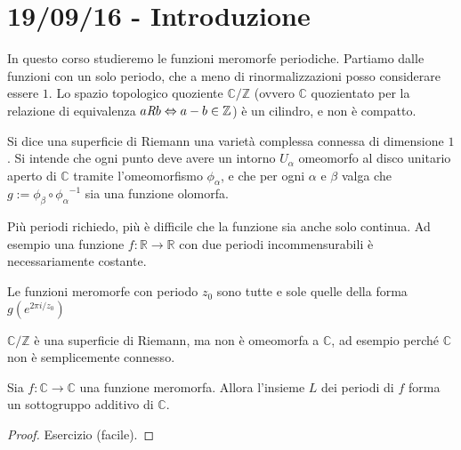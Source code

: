 \chapter{19/09/16 - Introduzione}
\justify

In questo corso studieremo le funzioni meromorfe periodiche.
Partiamo dalle funzioni con un solo periodo, che a meno di rinormalizzazioni posso considerare essere $1$.
Lo spazio topologico quoziente $\mathbb{C}/\mathbb{Z}$ (ovvero $\mathbb{C}$ quozientato per la relazione di
equivalenza $a\textit{R}b \Leftrightarrow a-b \in \mathbb{Z}$) è un cilindro, e non è compatto.

\begin{definizione}
Si dice una superficie di Riemann una varietà complessa connessa di dimensione $1$.
Si intende che ogni punto deve avere un intorno $U_\alpha$ omeomorfo al disco unitario aperto di $\mathbb{C}$
tramite l'omeomorfismo $\phi_\alpha$, e che per ogni $\alpha$ e $\beta$ valga che $g:=\phi_\beta \circ {\phi_\alpha}^{-1}$
sia una funzione olomorfa.
\end{definizione}


\begin{osservazione}
Più periodi richiedo, più è difficile che la funzione sia anche solo continua. Ad esempio una funzione
$f:\mathbb{R}\rightarrow\mathbb{R}$ con due periodi incommensurabili è necessariamente costante.
\end{osservazione}

\begin{lemma}
Le funzioni meromorfe con periodo $z_0$ sono tutte e sole quelle della forma $g\left(e^{2\pi i/z_0}\right)$
\end{lemma}

\begin{osservazione}
$\mathbb{C} / \mathbb{Z}$ è una superficie di Riemann, ma non è omeomorfa a $\mathbb{C}$, ad esempio perché $\mathbb{C}$ non è semplicemente connesso.
\end{osservazione}

\begin{lemma}
Sia $f: \mathbb{C}\rightarrow\mathbb{C}$ una funzione meromorfa. Allora l'insieme $L$ dei periodi di $f$
forma un sottogruppo additivo di $\mathbb{C}$.
\end{lemma}
\begin{proof}
Esercizio (facile).
\end{proof}

